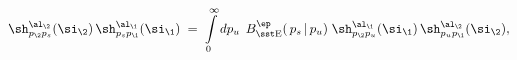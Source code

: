 \begin{equation}\label{braid}
\sh_{p_\2p_s}^{\al_\2}(\si_{\2})\,
\sh_{p_sp_\1}^{\al_\1}(\si_{\1})\;=\;
\int\limits_{0}^{\infty}dp_u \;\,B_{\rm\sst E}^{\ep}(\,p_s\,|\,p_u)\;
\sh_{p_\2p_u}^{\al_\1}(\si_{\1})\,\sh_{p_up_\1}^{\al_\2}(\si_{\2}),
\end{equation}

